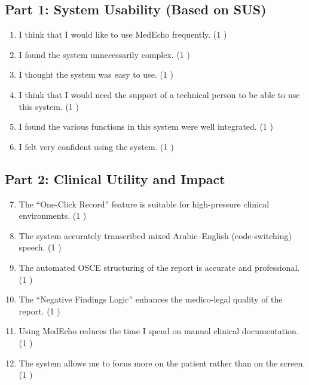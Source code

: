 \documentclass[12pt,a4paper]{report}
\begin{document}
\subsection*{Part 1: System Usability (Based on SUS)}

\begin{enumerate}
    \item I think that I would like to use MedEcho frequently. \hfill (1    )
    \item I found the system unnecessarily complex. \hfill (1    )
    \item I thought the system was easy to use. \hfill (1    )
    \item I think that I would need the support of a technical person to be able to use this system. \hfill (1    )
    \item I found the various functions in this system were well integrated. \hfill (1    )
    \item I felt very confident using the system. \hfill (1    )
\end{enumerate}

\subsection*{Part 2: Clinical Utility and Impact}

\begin{enumerate}
    \setcounter{enumi}{6}
    \item The ``One-Click Record'' feature is suitable for high-pressure clinical environments. \hfill (1    )
    \item The system accurately transcribed mixed Arabic--English (code-switching) speech. \hfill (1    )
    \item The automated OSCE structuring of the report is accurate and professional. \hfill (1    )
    \item The ``Negative Findings Logic'' enhances the medico-legal quality of the report. \hfill (1    )
    \item Using MedEcho reduces the time I spend on manual clinical documentation. \hfill (1    )
    \item The system allows me to focus more on the patient rather than on the screen. \hfill (1    )
\end{enumerate}
\end{document}
